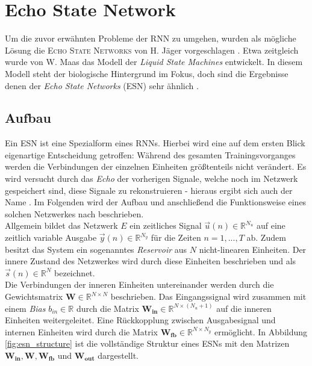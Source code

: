 \section{Echo State Network}
\label{sc:esn}
Um die zuvor erwähnten Probleme der \textsc{RNN} zu umgehen, wurden als mögliche Lösung die \textsc{Echo State Networks} von H. Jäger vorgeschlagen \cite{jaeger2010}. Etwa zeitgleich wurde von W. Maas das Modell der \textit{Liquid State Machines} entwickelt. In diesem Modell steht der biologische Hintergrund im Fokus, doch sind die Ergebnisse denen der \textit{Echo State Networks} (\textsc{ESN}) sehr ähnlich \citep{Maass2011}. 

\subsection{Aufbau}
\label{sec:esn_structure}
Ein \textsc{ESN} ist eine Spezialform eines \textsc{RNN}s. Hierbei wird eine auf dem ersten Blick eigenartige Entscheidung getroffen: Während des gesamten Trainingsvorganges werden die Verbindungen der einzelnen Einheiten größtenteils nicht verändert. Es wird versucht durch das \textit{Echo} der vorherigen Signale, welche noch im Netzwerk gespeichert sind, diese Signale zu rekonstruieren - hieraus ergibt sich auch der Name \cite{lukoseviciusa2009}. Im Folgenden wird der Aufbau und anschließend die Funktionsweise eines solchen Netzwerkes nach \citep{jaeger2007} beschrieben.\\

Allgemein bildet das Netzwerk $E$ ein zeitliches Signal $\vec{u}(n) \in \mathbb{R}^{N_u}$  auf eine zeitlich variable Ausgabe $\vec{y}(n) \in \mathbb{R}^{N_y}$ für die Zeiten $n=1, ..., T$ ab. Zudem besitzt das System ein sogenanntes \textit{Reservoir} aus $N$ nicht-linearen Einheiten. Der innere Zustand des Netzwerkes wird durch diese Einheiten beschrieben und als $\vec{s}(n) \in \mathbb{R}^{N}$ bezeichnet.\\

Die Verbindungen der inneren Einheiten untereinander werden durch die Gewichtsmatrix $\mathbf{W} \in \mathbb{R}^{N \times N}$ beschrieben. Das Eingangssignal wird zusammen mit einem \textit{Bias} $b_{in} \in \mathbb{R}$ durch die Matrix $\mathbf{W_{in}} \in \mathbb{R}^{N \times (N_u+1)}$ auf die inneren Einheiten weitergeleitet. Eine Rückkopplung zwischen Ausgabesignal und internen Einheiten wird durch die Matrix $\mathbf{W_{fb}} \in \mathbb{R}^{N \times N_y}$ ermöglicht. In Abbildung \ref{fig:esn_structure} ist die vollständige Struktur eines \textsc{ESN}s mit den Matrizen $\mathbf{W_{in}}, \mathbf{W}, \mathbf{W_{fb}}$ und $\mathbf{W_{out}}$ dargestellt.

